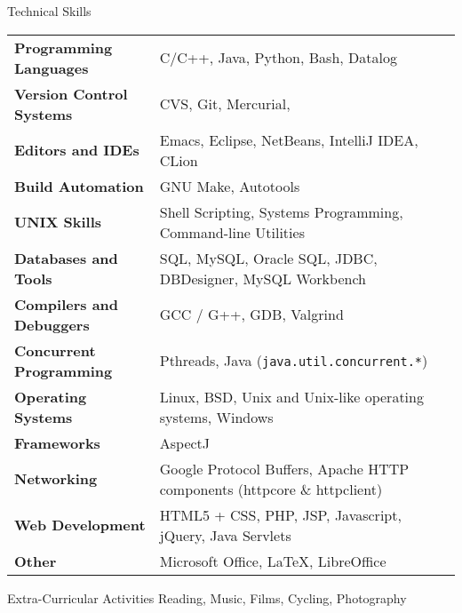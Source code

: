 \documentclass{resume}
\begin{document}
\begin{rSection}{Technical Skills}

{\renewcommand{\arraystretch}{1.3}
\begin{tabular}{ @{} >{\bfseries}l @{\hspace{6ex}} l }

Programming Languages
   & C/C++, Java, Python, Bash,  Datalog \\

Version Control Systems
   & CVS, Git, Mercurial, \\

Editors and IDEs
   & Emacs, Eclipse, NetBeans, IntelliJ IDEA, CLion \\

Build Automation
   & GNU Make, Autotools \\

UNIX Skills
   & Shell Scripting, Systems Programming, Command-line Utilities \\

Databases and Tools
   & SQL, MySQL, Oracle SQL, JDBC, DBDesigner, MySQL Workbench \\

Compilers and Debuggers
   & GCC / G++, GDB, Valgrind \\

Concurrent Programming
   & Pthreads, Java (\texttt{java.util.concurrent.*}) \\

Operating Systems
   & Linux, BSD, Unix and Unix-like operating systems, Windows \\

Frameworks
   & AspectJ \\

Networking
   & Google Protocol Buffers, Apache HTTP components (httpcore \& httpclient) \\

Web Development
   & HTML5 + CSS, PHP, JSP, Javascript, jQuery, Java Servlets \\

Other
   & Microsoft Office, \LaTeX{}, LibreOffice \\
\end{tabular}}
\end{rSection}


\begin{rSection}{Extra-Curricular Activities}
  Reading, Music, Films, Cycling, Photography \\
\end{rSection}
\end{document}
